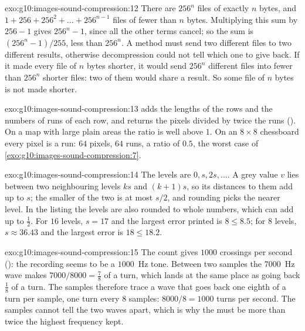 \begin{solution}{exo:g10:images-sound-compression:12}
There are $256^n$ files of exactly $n$ bytes, and $1 + 256 + 256^2 + \dots + 256^{n-1}$ files of fewer than $n$ bytes.
Multiplying this sum by $256 - 1$ gives $256^n - 1$, since all the other terms cancel; so the sum is
$(256^n - 1)/255$, less than $256^n$. A  method must send two different files to two different results,
otherwise decompression could not tell which one to give back. If it made every file of $n$ bytes shorter, it would
send $256^n$ different files into fewer than $256^n$ shorter files: two of them would share a result. So some file of
$n$ bytes is not made shorter.
\end{solution}

\begin{solution}{exo:g10:images-sound-compression:13}
 adds the lengths of the rows and the numbers of runs of each row, and returns the pixels divided
by twice the runs (). On a map with large plain areas the ratio is well above $1$. On an
$8 \times 8$ chessboard every pixel is a run: $64$ pixels, $64$ runs, a ratio of $0.5$, the worst case of
\cref{exo:g10:images-sound-compression:7}.
\end{solution}

\begin{solution}{exo:g10:images-sound-compression:14}
The levels are $0, s, 2s, \dots$. A grey value $v$ lies between two neighbouring levels $ks$ and $(k + 1)s$, so its
distances to them add up to $s$; the smaller of the two is at most $s/2$, and rounding picks the nearer level. In the
listing the levels are also rounded to whole numbers, which can add up to $\tfrac12$. For $16$ levels, $s = 17$ and
the largest error printed is $8 \le 8.5$; for $8$ levels, $s \approx 36.43$ and the largest error is
$18 \le 18.2$.
\end{solution}

\begin{solution}{exo:g10:images-sound-compression:15}
The count gives $1000$ crossings per second (): the recording seems to be a $1000$~Hz
tone. Between two samples the $7000$~Hz wave makes $7000/8000 = \tfrac78$ of a turn, which lands at the same place as
going back $\tfrac18$ of a turn. The samples therefore trace a wave that goes back one eighth of a turn per sample,
one turn every $8$ samples: $8000 / 8 = 1000$ turns per second. The samples cannot tell the two waves apart, which is
why the  must be more than twice the highest frequency kept.
\end{solution}

